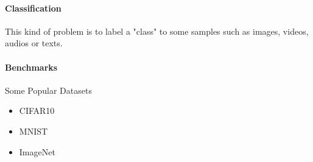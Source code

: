 \paragraph{Classification} 
This kind of problem is to label a "class" to some samples 
such as images, videos, audios or texts.

\paragraph{Benchmarks}

Some Popular Datasets 
\begin{itemize}
    \item CIFAR10
    \item MNIST
    \item ImageNet 
\end{itemize}


